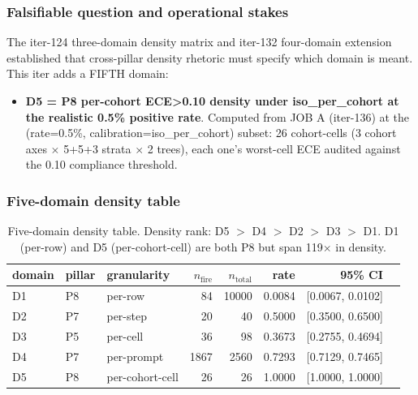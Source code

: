 
\subsubsection{Falsifiable question and operational stakes}

The iter-124 three-domain density matrix and iter-132 four-domain
extension established that cross-pillar density rhetoric must specify
which domain is meant. This iter adds a FIFTH domain:
\begin{itemize}
\item \textbf{D5 = P8 per-cohort ECE>0.10 density under iso\_per\_cohort at the realistic 0.5\% positive rate}.
      Computed from JOB A (iter-136) at the (rate=0.5\%, calibration=iso\_per\_cohort) subset:
      26 cohort-cells (3 cohort axes $\times$ 5+5+3 strata $\times$ 2 trees), each one's
      worst-cell ECE audited against the 0.10 compliance threshold.
\end{itemize}

\subsubsection{Five-domain density table}

\begin{table}[h]
\centering\small
\begin{tabular}{l l l r r r r r}
\toprule
domain & pillar & granularity & $n_\mathrm{fire}$ & $n_\mathrm{total}$ & rate & 95\% CI \\
\midrule
D1 & P8 & per-row       & 84    & 10000 & 0.0084 & [0.0067, 0.0102] \\
D2 & P7 & per-step      & 20    & 40    & 0.5000 & [0.3500, 0.6500] \\
D3 & P5 & per-cell      & 36    & 98    & 0.3673 & [0.2755, 0.4694] \\
D4 & P7 & per-prompt    & 1867  & 2560  & 0.7293 & [0.7129, 0.7465] \\
D5 & P8 & per-cohort-cell & 26 & 26    & 1.0000 & [1.0000, 1.0000] \\
\bottomrule
\end{tabular}
\caption{Five-domain density table. Density rank: D5 $>$ D4 $>$ D2 $>$ D3 $>$ D1.
   D1 (per-row) and D5 (per-cohort-cell) are both P8 but span 119$\times$ in density.}
\label{tab:synth-iter136-density}
\end{table}

